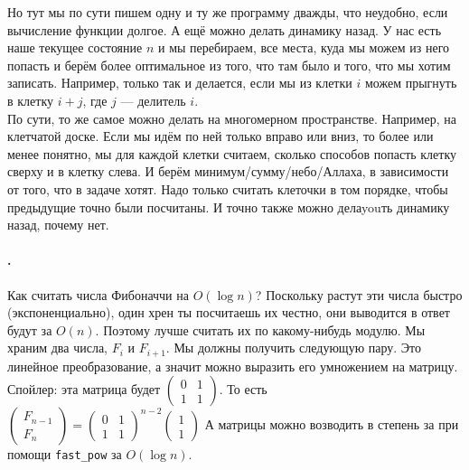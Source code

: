\documentclass{article}
\newcommand{\pseudo}{PseudoLexer.py:PseudoLexer -x}
\newcommand{\pseudocode}[1]{\texttt{#1}}
\begin{document}
    Но тут мы по сути пишем одну и ту же программу дважды, что неудобно, если вычисление функции долгое.
    А ещё можно делать динамику назад. У нас есть наше текущее состояние $n$ и мы перебираем, все места, куда мы можем из него попасть и берём более оптимальное из того, что там было и того, что мы хотим записать. Например, только так и делается, если мы из клетки $i$ можем прыгнуть в клетку $i+j$, где $j$ --- делитель $i$.\\
    По сути, то же самое можно делать на многомерном пространстве. Например, на клетчатой доске. Если мы идём по ней только вправо или вниз, то более или менее понятно, мы для каждой клетки считаем, сколько способов попасть клетку сверху и в клетку слева. И берём минимум/сумму/небо/Аллаха, в зависимости от того, что в задаче хотят. Надо только считать клеточки в том порядке, чтобы предыдущие точно были посчитаны. И точно также можно делаyouть динамику назад, почему нет.
    \paragraph{.}
    Как считать числа Фибоначчи на $O(\log n)$? Поскольку растут эти числа быстро (экспоненциально), один хрен ты посчитаешь их честно, они выводится в ответ будут за $O(n)$. Поэтому лучше считать их по какому-нибудь модулю. Мы храним два числа, $F_i$ и $F_{i+1}$. Мы должны получить следующую пару. Это линейное преобразование, а значит можно выразить его умножением на матрицу. Спойлер: эта матрица будет $\left(\begin{matrix}
        0&1\\
        1&1
    \end{matrix}\right)$.
    То есть $\left(\begin{matrix}
        F_{n-1}\\
        F_n
    \end{matrix}\right)=\left(\begin{matrix}
        0&1\\
        1&1
    \end{matrix}\right)^{n-2}\left(\begin{matrix}
        1\\
        1
    \end{matrix}\right)$
    А матрицы можно возводить в степень за при помощи \pseudocode{fast_pow} за $O(\log n)$.
\end{document}
